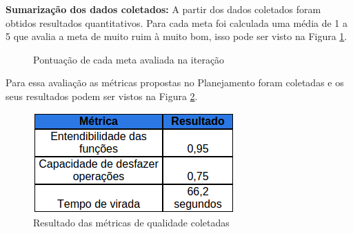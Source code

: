   \textbf{Sumarização dos dados coletados:}
  A partir dos dados coletados foram obtidos resultados quantitativos. Para cada meta foi calculada uma média de 1 a 5 que avalia a meta
  de muito ruim à muito bom, isso pode ser visto na Figura \ref{fig:grafico2}.
  \pagebreak
  \begin{figure}[h!]
  \centering
    \caption{Pontuação de cada meta avaliada na iteração}
    \label{fig:grafico2}
\end{figure}
  
  Para essa avaliação as métricas propostas no Planejamento foram coletadas e os seus resultados podem ser vistos na Figura \ref{fig:metricas}.
  
  \begin{figure}[h!]
  \centering
    \includegraphics[keepaspectratio=true, scale=0.6]{figuras/metricas.png}
  \caption{Resultado das métricas de qualidade coletadas}
  \label{fig:metricas}
\end{figure}

